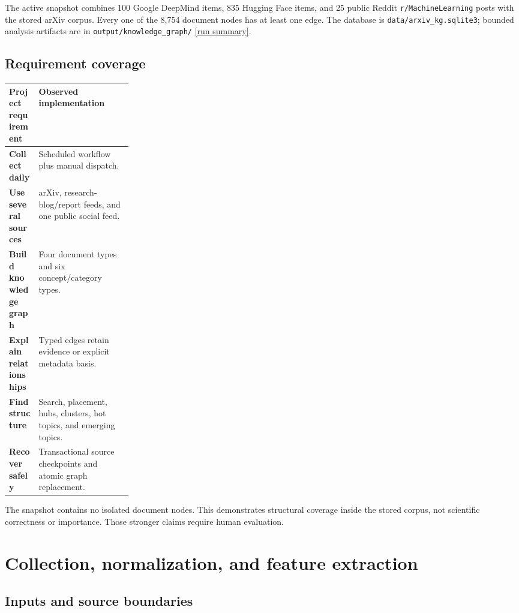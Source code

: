 \documentclass[10pt]{article}
\newcommand{\reposource}[2]{\href{#1}{\textcolor{reportblue}{[#2]}}}
\begin{document}
The active snapshot combines 100 Google DeepMind items, 835 Hugging Face
items, and 25 public Reddit \texttt{r/MachineLearning} posts with the stored
arXiv corpus. Every one of the 8,754 document nodes has at least one edge. The
database is \texttt{data/arxiv\_kg.sqlite3}; bounded analysis artifacts are in
\texttt{output/knowledge\_graph/}
\reposource{https://github.com/garyzhang1006/paper-fetcher/blob/main/output/knowledge_graph/summary.json}{run summary}.

\subsection{Requirement coverage}

\begin{table}[h]
  \centering
  \small
  \begin{tabularx}{\linewidth}{>{\bfseries}p{0.24\linewidth}Y}
    \toprule
    Project requirement & Observed implementation \\
    \midrule
    Collect daily & Scheduled workflow plus manual dispatch. \\
    Use several sources & arXiv, research-blog/report feeds, and one public social feed. \\
    Build knowledge graph & Four document types and six concept/category types. \\
    Explain relationships & Typed edges retain evidence or explicit metadata basis. \\
    Find structure & Search, placement, hubs, clusters, hot topics, and emerging topics. \\
    Recover safely & Transactional source checkpoints and atomic graph replacement. \\
    \bottomrule
  \end{tabularx}
\end{table}

The snapshot contains no isolated document nodes. This demonstrates structural
coverage inside the stored corpus, not scientific correctness or importance.
Those stronger claims require human evaluation.

\clearpage

\section{Collection, normalization, and feature extraction}

\subsection{Inputs and source boundaries}
\end{document}
